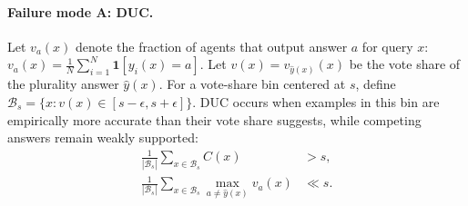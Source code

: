 \paragraph{Failure mode A: DUC.}

Let \(v_a(x)\) denote the fraction of agents that output answer \(a\) for query \(x\):
$
v_a(x)=\frac{1}{N}\sum_{i=1}^{N}\mathbf{1}[y_i(x)=a].
$
Let \(v(x)=v_{\hat{y}(x)}(x)\) be the vote share of the plurality answer \(\hat{y}(x)\). 
For a vote-share bin centered at \(s\), define
$
\mathcal{B}_s=\{x: v(x)\in[s-\epsilon,s+\epsilon]\}.
$
DUC occurs when examples in this bin are empirically more accurate than their vote share suggests, while competing answers remain weakly supported:
\begin{equation}
    \begin{aligned}
\frac{1}{|\mathcal{B}_s|}\sum_{x\in\mathcal{B}_s} C(x) &> s, \\
\frac{1}{|\mathcal{B}_s|}\sum_{x\in\mathcal{B}_s}
\max_{a\neq \hat{y}(x)} v_a(x) &\ll s.
\end{aligned}
\end{equation}









